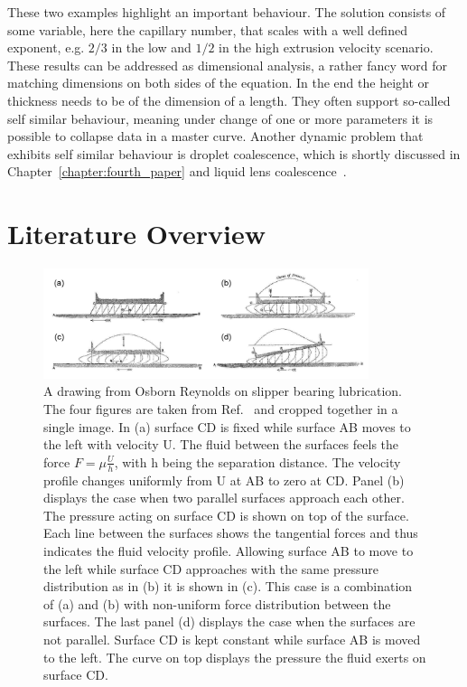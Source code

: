 These two examples highlight an important behaviour.
The solution consists of some variable, here the capillary number, that scales with a well defined exponent, e.g. $2/3$ in the low and $1/2$ in the high extrusion velocity scenario.
These results can be addressed as dimensional analysis, a rather fancy word for matching dimensions on both sides of the equation.
In the end the height or thickness needs to be of the dimension of a length.
They often support so-called self similar behaviour, meaning under change of one or more parameters it is possible to collapse data in a master curve. 
Another dynamic problem that exhibits self similar behaviour is droplet coalescence, which is shortly discussed in Chapter~\ref{chapter:fourth_paper} and liquid lens coalescence~\cite{hackSelfSimilarLiquidLens2020}. 
\section{Literature Overview}
\label{section:literature}
\begin{figure}
    \centering
    \includegraphics[width=0.85\textwidth]{graphics/reynolds_slip_bearing.pdf}
    \caption{A drawing from Osborn Reynolds on slipper bearing lubrication.
    The four figures are taken from Ref.~\cite{reynoldsTheoryLubricationIts1886} and cropped together in a single image.
    In (a) surface CD is fixed while surface AB moves to the left with velocity U. 
    The fluid between the surfaces feels the force $F = \mu \frac{U}{h}$, with h being the separation distance.
    The velocity profile changes uniformly from U at AB to zero at CD. 
    Panel (b) displays the case when two parallel surfaces approach each other.
    The pressure acting on surface CD is shown on top of the surface.
    Each line between the surfaces shows the tangential forces and thus indicates the fluid velocity profile.
    Allowing surface AB to move to the left while surface CD approaches with the same pressure distribution as in (b) it is shown in (c).
    This case is a combination of (a) and (b) with non-uniform force distribution between the surfaces.
    The last panel (d) displays the case when the surfaces are not parallel.
    Surface CD is kept constant while surface AB is moved to the left.
    The curve on top displays the pressure the fluid exerts on surface CD.}
    \label{fig:reynolds_work}
\end{figure}
